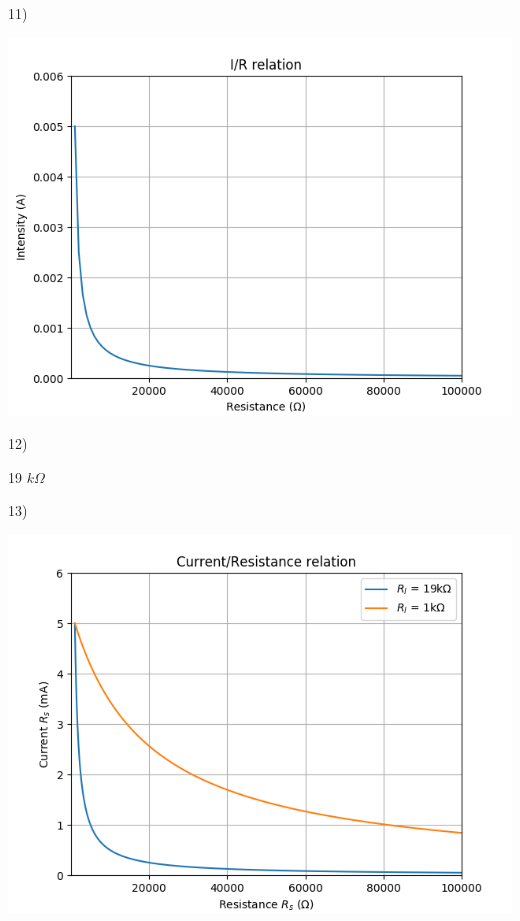 \documentclass{../../myassignment}
\newcommand{\ohm}{$\Omega$ }
\newcommand{\kilo}{$k$}
\begin{document}
	11)

	\begin{answer}
		\includegraphics[scale=0.8]{relampereohm.png}
	\end{answer}


	12)
	\begin{answer}
		19 \kilo\ohm %
	\end{answer}

	13)

	\begin{answer}
		\includegraphics[scale=0.8]{variableresistor.png}
	\end{answer}
\end{document}
